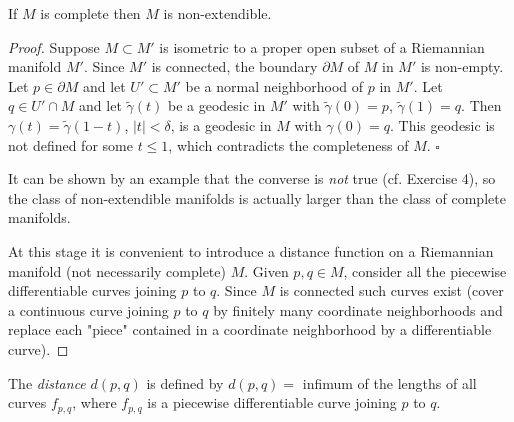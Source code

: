 \begin{proposition}[Proposition 2.3]
  \label{prop:dc-ch7-2-3}
  \leanok
  If $M$ is complete then $M$ is non-extendible.
\end{proposition}
\begin{proof}
  \leanok
  Suppose $M\subset M'$ is isometric to a proper open subset of a
  Riemannian manifold $M'$. Since $M'$ is connected, the boundary $\partial M$ of
  $M$ in $M'$ is non-empty. Let $p\in\partial M$ and let $U'\subset M'$ be a normal
  neighborhood of $p$ in $M'$. Let $q\in U'\cap M$ and let $\tilde\gamma(t)$ be a
  geodesic in $M'$ with $\tilde\gamma(0)=p$, $\tilde\gamma(1)=q$. Then
  $\gamma(t)=\tilde\gamma(1-t)$, $|t| < \delta$, is a geodesic in $M$ with
  $\gamma(0)=q$. This geodesic is not defined for some $t\le 1$, which contradicts
  the completeness of $M$. $\square$
  
  It can be shown by an example that the converse is \emph{not} true (cf. Exercise 4),
  so the class of non-extendible manifolds is actually larger than the class of
  complete manifolds.
  
  At this stage it is convenient to introduce a distance function on a Riemannian
  manifold (not necessarily complete) $M$. Given $p,q\in M$, consider all the
  piecewise differentiable curves joining $p$ to $q$. Since $M$ is connected such
  curves exist (cover a continuous curve joining $p$ to $q$ by finitely many
  coordinate neighborhoods and replace each "piece" contained in a coordinate
  neighborhood by a differentiable curve).
\end{proof}

\begin{definition}[distance]
  \label{def:dc-ch7-2-4}
  \leanok
  The \emph{distance} $d(p,q)$ is defined by $d(p,q)=$ infimum of the lengths of all
  curves $f_{p,q}$, where $f_{p,q}$ is a piecewise differentiable curve joining $p$
  to $q$.
\end{definition}

